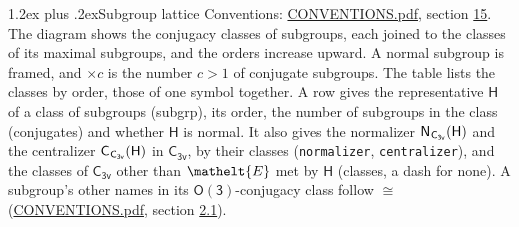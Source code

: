 \documentclass[10pt,a4paper]{article}
\makeatletter
\renewcommand\section{\@startsection{section}{1}{\z@}{-3ex plus -1ex minus -.2ex}%
  {1.2ex plus .2ex}{\normalfont\large\sffamily\bfseries\color{parttitle}}}
\numberwithin{equation}{section}
\newcommand{\eltfont}[1]{{\let\sigma\eltsigma\mathelt{#1}}}
\newcommand{\grp}[1]{\mathsf{#1}}
\newcommand{\cls}[1]{\eltfont{#1}}
\newcommand{\samecls}{\cong}
\newcommand{\nconj}[1]{{\scriptsize$\times#1$}}
\newcommand{\hairsp}{\mkern1mu}
\makeatother
\begin{document}
\section{Subgroup lattice}\label{s:subgroups}
Conventions: \href{../../CONVENTIONS.pdf}{CONVENTIONS.pdf}, section \href{../../CONVENTIONS.pdf\#conv.15}{15}.
The diagram shows the conjugacy classes of subgroups, each joined to the classes of its maximal subgroups, and the orders increase upward. A normal subgroup is framed, and ${\times}c$ is the number $c > 1$ of conjugate subgroups. The table lists the classes by order, those of one symbol together. \label{n:group.H}\label{n:head.subgroup}\label{n:head.order}\label{n:head.conjugates}\label{n:head.normal}A row gives the representative $\grp{H}$ of a class of subgroups (subgrp), its order, the number of subgroups in the class (conjugates) and whether $\grp{H}$ is normal. \label{n:group.normalizer}\label{n:group.centralizer}\label{n:head.classes}It also gives the normalizer $\grp{N}_{\hairsp \grp{C_{3v}}}(\grp{H})$ and the centralizer $\grp{C}_{\hairsp \grp{C_{3v}}}(\grp{H})$ in $\grp{C_{3v}}$, by their classes (\texttt{normalizer}, \texttt{centralizer}), and the classes of $\grp{C_{3v}}$ other than $\cls{E}$ met by $\grp{H}$ (classes, a dash for none). A subgroup's other names in its \href{O3.pdf}{$\grp{O(3)}$}-conjugacy class follow $\samecls$ (\href{../../CONVENTIONS.pdf}{CONVENTIONS.pdf}, section \href{../../CONVENTIONS.pdf\#conv.2.1}{2.1}).
\begin{center}
\end{center}
\end{document}

